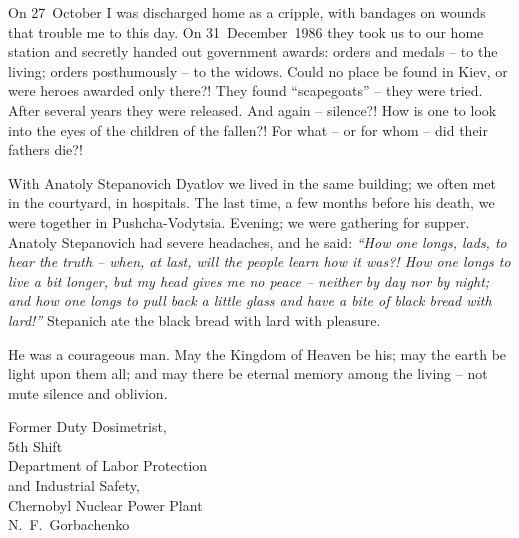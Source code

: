 \documentclass[openright]{bookest}
\begin{document}
On 27~October I was discharged home as a cripple, with bandages on wounds that trouble me to this day. On 31~December~1986 they took us to our home station and secretly handed out government awards: orders and medals -- to the living; orders posthumously -- to the widows. Could no place be found in Kiev, or were heroes awarded only there?! They found ``scapegoats'' -- they were tried. After several years they were released. And again -- silence?! How is one to look into the eyes of the children of the fallen?! For what -- or for whom -- did their fathers die?!

With Anatoly Stepanovich Dyatlov we lived in the same building; we often met in the courtyard, in hospitals. The last time, a few months before his death, we were together in Pushcha-Vodytsia. Evening; we were gathering for supper. Anatoly Stepanovich had severe headaches, and he said:
\textit{``How one longs, lads, to hear the truth -- when, at last, will the people learn how it was?! How one longs to live a bit longer, but my head gives me no peace -- neither by day nor by night; and how one longs to pull back a little glass and have a bite of black bread with lard!''}
Stepanich ate the black bread with lard with pleasure.

He was a courageous man. May the Kingdom of Heaven be his; may the earth be light upon them all; and may there be eternal memory among the living -- not mute silence and oblivion.

\begin{flushright}
Former Duty Dosimetrist,\\
5th Shift\\
Department of Labor Protection\\
and Industrial Safety,\\
Chernobyl Nuclear Power Plant\\[0.5\baselineskip]
N.~F.~Gorbachenko
\end{flushright}
\end{document}

